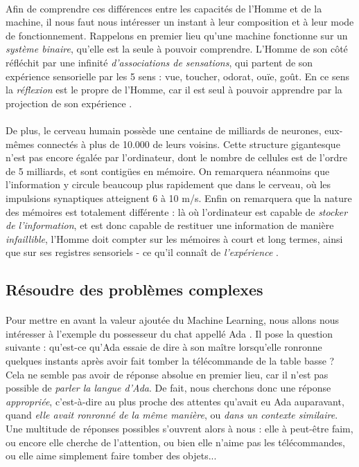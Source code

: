 \paragraph{} Afin de comprendre ces différences entre les capacités de l'Homme et de la machine, il nous faut nous
intéresser un instant à leur composition et à leur mode de fonctionnement. Rappelons en premier lieu qu'une machine
fonctionne sur un \emph{système binaire}, qu'elle est la seule à pouvoir comprendre. L'Homme de son côté réfléchit
par une infinité \emph{d'associations de sensations}, qui partent de son expérience sensorielle par les 5 sens : vue,
toucher, odorat, ouïe, goût. En ce sens la \emph{réflexion} est le propre de l'Homme, car il est seul à pouvoir 
apprendre par la projection de son expérience \cite{Brain1}.

\paragraph{} De plus, le cerveau humain possède une centaine de milliards de neurones, eux-mêmes connectés à plus de 10.000
de leurs voisins. Cette structure gigantesque n'est pas encore égalée par l'ordinateur, dont le nombre de cellules est de
l'ordre de 5 milliards, et sont contigües en mémoire. On remarquera néanmoins que l'information y circule
beaucoup plus rapidement que dans le cerveau, où les impulsions synaptiques atteignent 6 à 10 m/s. Enfin on remarquera que la
nature des mémoires est totalement différente : là où l'ordinateur est capable de \emph{stocker de l'information}, et est donc
capable de restituer une information de manière \emph{infaillible}, l'Homme doit compter sur les mémoires à court et long termes,
ainsi que sur ses registres sensoriels - ce qu'il connaît de \emph{l'expérience} \cite{Brain0}.


\subsection*{Résoudre des problèmes complexes}

\paragraph{} Pour mettre en avant la valeur ajoutée du Machine Learning, nous allons nous intéresser à l'exemple
du possesseur du chat appellé Ada \cite{MachineLearning0}. Il pose la question suivante : qu'est-ce qu'Ada essaie de dire
à son maître lorsqu'elle ronronne quelques instants après avoir fait tomber la télécommande de la table basse ? Cela ne semble
pas avoir de réponse absolue en premier lieu, car il n'est pas possible de \emph{parler la langue d'Ada}. De fait, nous cherchons
donc une réponse \emph{appropriée}, c'est-à-dire au plus proche des attentes qu'avait eu
Ada auparavant, quand \emph{elle avait ronronné de la même manière}, ou \emph{dans un contexte similaire}. Une multitude de réponses
possibles s'ouvrent alors à nous : elle à peut-être faim, ou encore elle cherche de l'attention, ou bien elle n'aime pas les
télécommandes, ou elle aime simplement faire tomber des objets...

